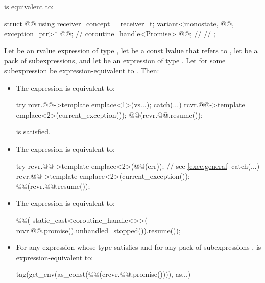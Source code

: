 \pnum
{} is equivalent to:
\begin{codeblock}
struct @@ {
  using receiver_concept = receiver_t;
  variant<monostate, @@, exception_ptr>* @@;   // \expos
  coroutine_handle<Promise> @@;                       // \expos
  // \seebelow
};
\end{codeblock}

\pnum
Let  be an rvalue expression of type ,
let  be a const lvalue that refers to ,
let  be a pack of subexpressions, and
let  be an expression of type .
Let 
for some subexpression  be expression-equivalent to
.
Then:
\begin{itemize}
\item
The expression  is equivalent to:
\begin{codeblock}
try {
  rcvr.@@->template emplace<1>(vs...);
} catch(...) {
  rcvr.@@->template emplace<2>(current_exception());
}
@@(rcvr.@@.resume());
\end{codeblock}

\mandates
{}
is satisfied.
\item
The expression  is equivalent to:
\begin{codeblock}
try {
  rcvr.@@->template emplace<2>(@@(err));  // see \ref{exec.general}
} catch(...) {
  rcvr.@@->template emplace<2>(current_exception());
}
@@(rcvr.@@.resume());
\end{codeblock}
\item
The expression  is equivalent to:
\begin{codeblock}
@@(
  static_cast<coroutine_handle<>>(
    rcvr.@@.promise().unhandled_stopped()).resume());
\end{codeblock}
\item
For any expression 
whose type satisfies  and
for any pack of subexpressions ,
 is expression-equivalent to:
\begin{codeblock}
tag(get_env(as_const(@@(crcvr.@@.promise()))),
    as...)
\end{codeblock}
\end{itemize}


